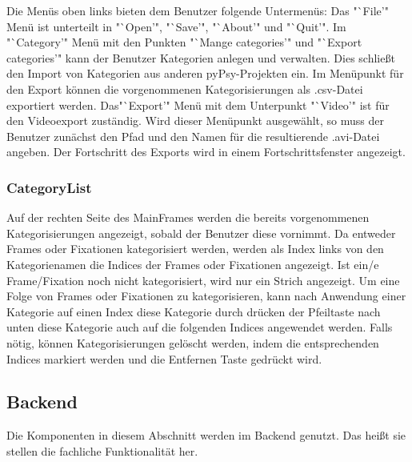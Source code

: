 \documentclass[a4paper,draft]{scrartcl}
\begin{document}
Die Menüs oben links bieten dem Benutzer folgende Untermenüs:
Das "`File'" Menü ist unterteilt in "`Open'", "`Save'", "`About'" und "`Quit'". 
Im "`Category'" Menü mit den Punkten "`Mange categories'" und "`Export categories'" kann der Benutzer Kategorien anlegen und verwalten. Dies schließt den Import von Kategorien aus anderen pyPsy-Projekten ein.
Im Menüpunkt für den Export können die vorgenommenen Kategorisierungen als .csv-Datei exportiert werden. 
Das"`Export'" Menü mit dem Unterpunkt "`Video'" ist für den Videoexport zuständig. Wird dieser Menüpunkt ausgewählt, so muss der Benutzer zunächst den Pfad und den Namen für die resultierende .avi-Datei angeben. Der Fortschritt des Exports wird in einem Fortschrittsfenster angezeigt.


\subsubsection{CategoryList}
Auf der rechten Seite des MainFrames werden die bereits vorgenommenen Kategorisierungen angezeigt, sobald der Benutzer diese vornimmt. 
Da entweder Frames oder Fixationen kategorisiert werden, werden als Index links von den Kategorienamen die Indices der Frames oder Fixationen angezeigt. Ist ein/e Frame/Fixation noch nicht kategorisiert, wird nur ein Strich angezeigt.
Um eine Folge von Frames oder Fixationen zu kategorisieren, kann nach Anwendung einer Kategorie auf einen Index diese Kategorie durch drücken der Pfeiltaste nach unten diese Kategorie auch auf die folgenden Indices angewendet werden.
Falls nötig, können Kategorisierungen gelöscht werden, indem die entsprechenden Indices markiert werden und die Entfernen Taste gedrückt wird. 

\subsection{Backend}
Die Komponenten in diesem Abschnitt werden im Backend genutzt.
Das hei\ss t sie stellen die fachliche Funktionalit\"at her.
\end{document}
